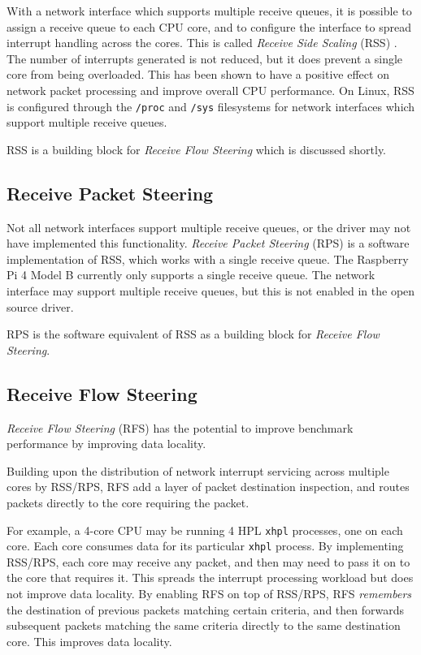With a network interface which supports multiple receive queues, it is possible to assign a receive queue to each CPU core, and to configure the interface to spread interrupt handling across the cores. This is called \emph{Receive Side Scaling} (RSS) \cite{scaling}. The number of interrupts generated is not reduced, but it does prevent a single core from being overloaded. This has been shown to have a positive effect on network packet processing and improve overall CPU performance. On Linux, RSS is configured through the \verb|/proc| and \verb|/sys| filesystems for network interfaces which support multiple receive queues.

RSS is a building block for \emph{Receive Flow Steering} which is discussed shortly.


\subsection{Receive Packet Steering}

Not all network interfaces support multiple receive queues, or the driver may not have implemented this functionality. \emph{Receive Packet Steering} (RPS) \cite{scaling} is a software implementation of RSS, which works with a single receive queue. The Raspberry Pi 4 Model B currently only supports a single receive queue. The network interface may support multiple receive queues, but this is not enabled in the open source driver.

RPS is the software equivalent of RSS as a building block for \emph{Receive Flow Steering}.


\subsection{Receive Flow Steering}

\emph{Receive Flow Steering} (RFS) \cite{scaling} has the potential to improve benchmark performance by improving data locality.

Building upon the distribution of network interrupt servicing across multiple cores by RSS/RPS, RFS add a layer of packet destination inspection, and routes packets directly to the core requiring the packet.

For example, a 4-core CPU may be running 4 HPL \verb|xhpl| processes, one on each core. Each core consumes data for its particular \verb|xhpl| process. By implementing RSS/RPS, each core may receive any packet, and then may need to pass it on to the core that requires it. This spreads the interrupt processing workload but does not improve data locality. By enabling RFS on top of RSS/RPS, RFS \emph{remembers} the destination of previous packets matching certain criteria, and then forwards subsequent packets matching the same criteria directly to the same destination core. This improves data locality.

